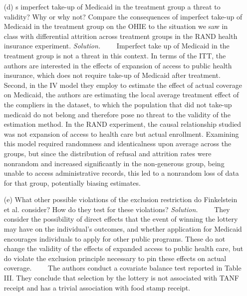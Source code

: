 \documentclass[
]{article}
\begin{document}
\begin{enumerate}
\item[(d)] s imperfect take-up of Medicaid in the treatment group a threat to validity? Why or why not? Compare the consequences of imperfect take-up of Medicaid in the treatment group on the OHIE to the situation we saw in class with differential attrition across treatment groups in the RAND health insurance experiment.
\newline
\newline
\textit{Solution.}\newline
    Imperfect take up of Medicaid in the treatment group is not a threat in this context. In terms of the ITT, the authors are interested in the effects of expansion of access to public health insurance, which does not require take-up of Medicaid after treatment. Second, in the IV model they employ to estimate the effect of actual coverage on Medicaid, the authors are estimating the local average treatment effect of the compliers in the dataset, to which the population that did not take-up medicaid do not belong and therefore pose no threat to the validity of the estimation method. In the RAND experiment, the causal relationship studied was not expansion of access to health care but actual enrollment. Examining this model required randomness and identicalness upon average across the groups, but since the distribution of refusal and attrition rates were nonrandom and increased significantly in the non-generous group, being unable to access administrative records, this led to a nonrandom loss of data for that group, potentially biasing estimates. 


\item[(e)] What other possible violations of the exclusion restriction do Finkelstein et al. consider? How do they test for these violations?
\newline
\newline
\textit{Solution.}\newline
    They consider the possibility of direct effects that the event of winning the lottery may have on the individual's outcomes, and whether application for Medicaid encourages individuals to apply for other public programs. These do not change the validity of the effects of expanded access to public health care, but do violate the exclusion principle necessary to pin these effects on actual coverage.\newline
    The authors conduct a covariate balance test reported in Table III. They conclude that selection by the lottery is not associated with TANF receipt and has a trivial association with food stamp receipt.

\end{enumerate}
\end{document}
